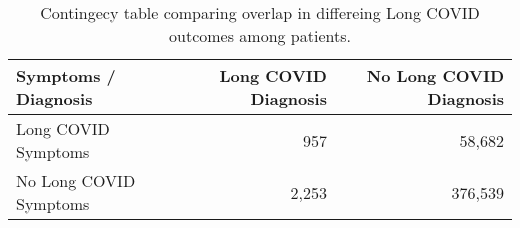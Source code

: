 \begin{table}[!htbp]
\centering
\begin{tabular}{lrr}
  \hline
Symptoms / Diagnosis & Long COVID Diagnosis & No Long COVID Diagnosis \\ 
  \hline
Long COVID Symptoms & 957 & 58,682 \\ 
  No Long COVID Symptoms & 2,253 & 376,539 \\ 
   \hline
\end{tabular}
\caption{Contingecy table comparing overlap in differeing Long COVID outcomes among patients.} 
\label{tab:contingency}
\end{table}
